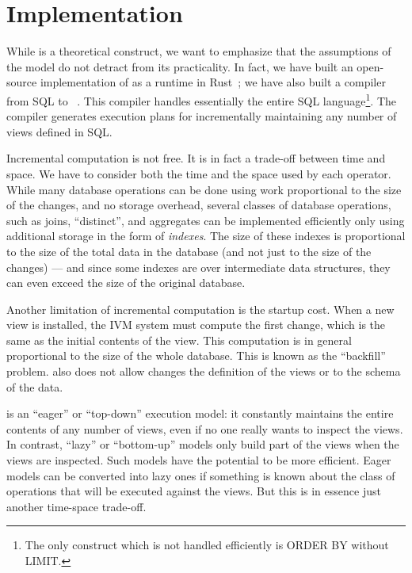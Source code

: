 \section{Implementation}\label{sec:implementation}


While \dbsp is a theoretical construct, we want to emphasize that the
assumptions of the model do not detract from its practicality.  In
fact, we have built an open-source implementation of \dbsp as a
runtime in Rust~\cite{dbsp-crate}; we have also built a compiler from
SQL to \dbsp~\cite{sql-to-dbsp-compiler}.  This compiler handles
essentially the entire SQL language\footnote{The only construct which
is not handled efficiently is ORDER BY without LIMIT.}.  The compiler
generates execution plans for incrementally maintaining any number of
views defined in SQL.

Incremental computation is not free.  It is in fact a trade-off
between time and space.  We have to consider both the time and the
space used by each operator.  While many database operations can be
done using work proportional to the size of the changes, and no
storage overhead, several classes of database operations, such as
joins, ``distinct'', and aggregates can be implemented efficiently
only using additional storage in the form of \emph{indexes}.  The size
of these indexes is proportional to the size of the total data in the
database (and not just to the size of the changes) --- and since some
indexes are over intermediate data structures, they can even exceed
the size of the original database.

Another limitation of incremental computation is the startup cost.
When a new view is installed, the IVM system must compute the first
change, which is the same as the initial contents of the view.  This
computation is in general proportional to the size of the whole
database.  This is known as the ``backfill'' problem.  \dbsp also does
not allow changes the definition of the views or to the schema of the
data.

\dbsp is an ``eager'' or ``top-down'' execution model: it constantly
maintains the entire contents of any number of views, even if no one
really wants to inspect the views.  In contrast, ``lazy'' or
``bottom-up'' models only build part of the views when the views are
inspected.  Such models have the potential to be more efficient.
Eager models can be converted into lazy ones if something is known
about the class of operations that will be executed against the views.
But this is in essence just another time-space trade-off.


